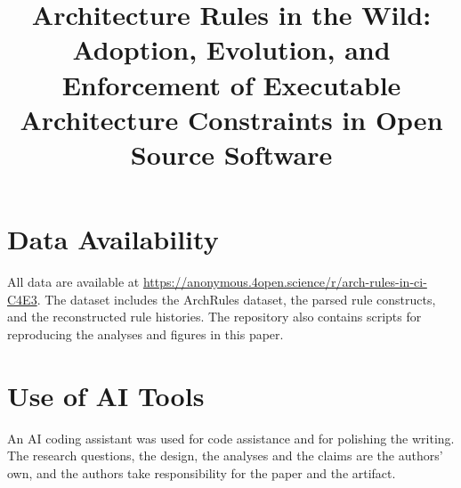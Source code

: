 \documentclass[conference]{IEEEtran}
\begin{document}
\title{Architecture Rules in the Wild: Adoption, Evolution, and Enforcement of Executable Architecture Constraints in Open Source Software}
\author{
}

\maketitle







%

%
\section*{Data Availability}
All data are available at \url{https://anonymous.4open.science/r/arch-rules-in-ci-C4E3}. The dataset includes the ArchRules dataset, the parsed rule constructs, and the reconstructed rule histories. The repository also contains scripts for reproducing the analyses and figures in this paper.
\section*{Use of AI Tools}
An AI coding assistant was used for code assistance and for polishing the writing. The research questions, the design, the analyses and the claims are the authors’ own, and the authors take responsibility for the paper and the artifact.
%
%




\end{document}
